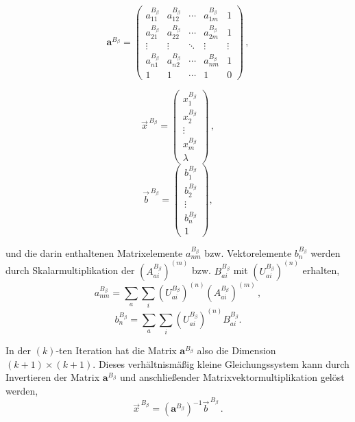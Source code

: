 	\begin{equation}\label{eq:amat}
	\boldsymbol{a}^{B_\beta}=
	\begin{pmatrix}
		a_{11}^{B_\beta} & a_{12}^{B_\beta} & \cdots & a_{1m}^{B_\beta} & 1 \\
		a_{21}^{B_\beta} & a_{22}^{B_\beta} & \cdots & a_{2m}^{B_\beta} & 1 \\
		\vdots & \vdots & \ddots & \vdots & \vdots\\
		a_{n1}^{B_\beta} & a_{n2}^{B_\beta} & \cdots & a_{nm}^{B_\beta} & 1 \\
		1      & 1      & \cdots & 1      & 0
	\end{pmatrix}\, ,
	\end{equation}
	
 	\begin{equation}
	\vec{x}^{\,B_\beta}=
	\begin{pmatrix}
		x_1^{B_\beta}\\
		x_2^{B_\beta}\\
		\vdots\\
		x_m^{B_\beta}\\
		\lambda
	\end{pmatrix}\, ,
	\end{equation}
	\begin{equation}\label{eq:bvec}
	\vec{b}^{\,B_\beta}=
	\begin{pmatrix}
		b_1^{B_\beta}\\
		b_2^{B_\beta}\\
		\vdots\\
		b_n^{B_\beta}\\
		1
	\end{pmatrix},
	\end{equation}  	
    
    und die darin enthaltenen Matrixelemente $a_{nm}^{B_\beta}$ bzw. Vektorelemente $b_n^{B_\beta}$ werden durch Skalarmultiplikation der $\left(A_{ai}^{B_\beta}\right)^{(m)}$ bzw. $B_{ai}^{B_\beta}$ mit $\left(U_{ai}^{B_\beta}\right)^{(n)}$ erhalten, 
    \begin{equation}\label{eq:anm}
    a_{nm}^{B_\beta}=\sum_{a}\sum_i \left(U_{ai}^{B_\beta}\right)^{(n)}\left(A_{ai}^{B_\beta}\right)^{(m)}\, ,
    \end{equation}
    \begin{equation}\label{eq:bn}
    b_n^{B_\beta}=\sum_a\sum_i\left(U_{ai}^{B_\beta}\right)^{(n)} B_{ai}^{B_\beta}.
    \end{equation}
    
    In der $(k)$-ten Iteration hat die Matrix $\boldsymbol{a}^{B_\beta}$ also die Dimension $(k+1)\times(k+1)$. Dieses verhältnismäßig kleine Gleichungssystem kann durch Invertieren der Matrix $\boldsymbol{a}^{B_\beta}$ und anschließender Matrixvektormultiplikation gelöst werden, 
    \begin{equation}\label{eq:xvec}
    \vec{x}^{\,B_\beta}=\left(\boldsymbol{a}^{B_\beta}\right)^{-1}\vec{b}^{\,B_\beta}\, .
    \end{equation}
    
